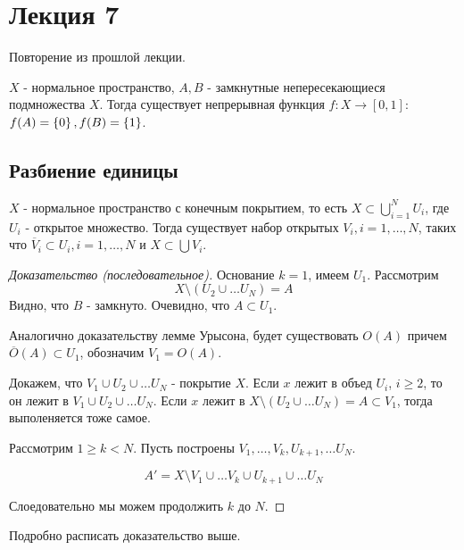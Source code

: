 \section{Лекция 7}

Повторение из прошлой лекции.
\begin{lemma}
    $X$ - нормальное пространство, $A, B$ - замкнутные непересекающиеся подмножества $X$.
    Тогда существует непрерывная функция $f : X \rightarrow [0,1]$: $f(A) = \left\{0\right\}, f(B) = \left\{1\right\}$.
\end{lemma}

\subsection{Разбиение единицы}

\begin{lemma}[об ужатии]
    $X$ - нормальное пространство с конечным покрытием, то есть $X \subset \bigcup_{i = 1}^N U_i$, где $U_i$ - открытое множество.
    Тогда существует набор открытых $V_i, i = 1, \ldots, N$, таких что $\overline{V}_i \subset U_i, i = 1, \ldots, N$ и $X \subset \bigcup V_i$.
\end{lemma}
\begin{proof}[Доказательство (последовательное)]
    Основание $k = 1$, имеем $U_1$. Рассмотрим
    \[
        X \setminus (U_2 \cup \ldots U_N) = A
    \]
    Видно, что $B$ - замкнуто. Очевидно, что $A \subset U_1$.

    Аналогично доказательству лемме Урысона, будет существовать $O(A)$ причем $\overline{O}(A) \subset U_1$, обозначим $V_1 = O(A)$.

    Докажем, что $V_1 \cup U_2 \cup \ldots U_N$ - покрытие $X$.
    Если $x$ лежит в объед $U_i$, $i \geq 2$, то он лежит в $V_1 \cup U_2 \cup \ldots U_N$.
    Если $x$ лежит в $X \setminus (U_2 \cup \ldots U_N) = A \subset V_1$, тогда выполеняется тоже самое.

    Рассмотрим $1 \geq k < N$. Пусть построены  $V_1, \ldots, V_k, U_{k + 1}, \ldots U_N$.
    
    \[
        A' = X \setminus V_1 \cup \ldots V_k \cup U_{k + 1} \cup \ldots U_N
    \]
    
    Слоедовательно мы можем продолжить $k$ до $N$.
\end{proof}

\begin{exercise}
    Подробно расписать доказательство выше.    
\end{exercise}


